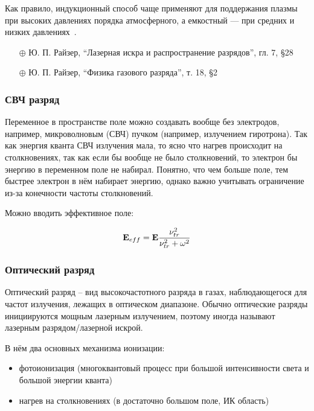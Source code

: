 \documentclass[10pt, a4paper]{article}
\begin{document}
Как правило, индукционный способ чаще применяют для поддержания плазмы при высоких давлениях порядка атмосферного, а емкостный — при средних и низких давлениях~\cite{raizer}.

\begin{itemize}
	\item[$\oplus$] Ю. П. Райзер, ``Лазерная искра и распространение разрядов'', гл. 7, \S 28
	\item[$\oplus$] Ю. П. Райзер, ``Физика газового разряда'', т. 18, \S 2
\end{itemize}

\subsubsection{СВЧ разряд}

Переменное в пространстве поле можно создавать вообще без электродов, например, микроволновым (СВЧ) пучком (например, излучением гиротрона). Так как энергия кванта СВЧ излучения мала, то ясно что нагрев происходит на столкновениях, так как если бы вообще не было столкновений, то электрон бы энергию в переменном поле не набирал. Понятно, что чем больше поле, тем быстрее электрон в нём набирает энергию, однако важно учитывать ограничение из-за конечности частоты столкновений.

Можно вводить эффективное поле: 

\begin{equation*}
	\vb{E}_{eff} = \vb{E} \frac{\nu_{tr}^{2}}{\nu_{tr}^2+\omega^2}
\end{equation*}

\subsubsection{Оптический разряд}

Оптический разряд -- вид высокочастотного разряда в газах, наблюдающегося для частот излучения, лежащих в оптическом диапазоне. Обычно оптические разряды инициируются мощным лазерным излучением, поэтому иногда называют лазерным разрядом/лазерной искрой.

В нём два основных механизма ионизации: 

\begin{itemize}
	
	\item фотоионизация (многоквантовый процесс при большой интенсивности света и большой энергии кванта)
	
	\item нагрев на столкновениях (в достаточно большом поле, ИК область)
	
\end{itemize}
\end{document}
